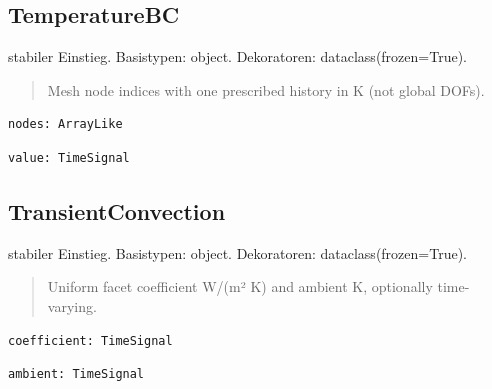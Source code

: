 \subsection{TemperatureBC}
stabiler Einstieg.
Basistypen: object. Dekoratoren: dataclass(frozen=True).
\begin{quote}
Mesh node indices with one prescribed history in K (not global DOFs).
\end{quote}
\begin{lstlisting}
nodes: ArrayLike
\end{lstlisting}
\begin{lstlisting}
value: TimeSignal
\end{lstlisting}
\subsection{TransientConvection}
stabiler Einstieg.
Basistypen: object. Dekoratoren: dataclass(frozen=True).
\begin{quote}
Uniform facet coefficient W/(m² K) and ambient K, optionally time-varying.
\end{quote}
\begin{lstlisting}
coefficient: TimeSignal
\end{lstlisting}
\begin{lstlisting}
ambient: TimeSignal
\end{lstlisting}
